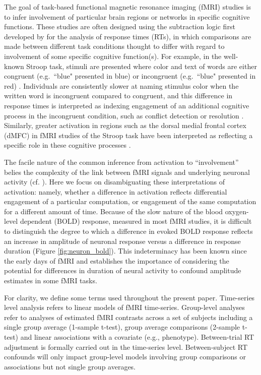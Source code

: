 \documentclass[sn-mathphys,Numbered, super, referee, lineno]{sn-jnl}
\begin{document}
The goal of task-based functional magnetic resonance imaging (fMRI) studies is to infer involvement of particular brain regions or networks in specific cognitive functions.  These studies are often designed using the subtraction logic first developed by \citet{donders1969} for the analysis of response times (RTs), in which comparisons are made between different task conditions thought to differ with regard to involvement of some specific cognitive function(s).  For example, in the well-known Stroop task, stimuli are presented where color and text of words are either congruent (e.g.\, ``blue" presented in blue) or incongruent (e.g.\, ``blue" presented in red) \citep{stroop_1935}.  Individuals are consistently slower at naming stimulus color when the written word is incongruent compared to congruent, and this difference in response times is interpreted as indexing engagement of an additional cognitive process in the incongruent condition, such as conflict detection or resolution \citep{botvinick2001}. Similarly, greater activation in regions such as the dorsal medial frontal cortex (dMFC) in fMRI studies of the Stroop task have been interpreted as reflecting a specific role in these cognitive processes \citep{botvinick1999, macdonald2000, kernsAnteriorCingulateConflict2004}.  

The facile nature of the common inference from activation to ``involvement'' belies the complexity of the link between fMRI signals and underlying neuronal activity (cf. \citet{logothetisWhatWeCan2008}).  Here we focus on disambiguating these interpretations of activation: namely, whether a difference in activation reflects differential engagement of a particular computation, or engagement of the same computation for a different amount of time.  Because of the slow nature of the blood oxygen-level dependent (BOLD) response, measured in most fMRI studies, it is difficult to distinguish the degree to which a difference in evoked BOLD response reflects an increase in amplitude of neuronal response versus a difference in response duration (Figure \ref{fig:neuron_bold}).  This indeterminacy has been known since the early days of fMRI \citep{savoy1995, fslbook2001} and establishes the importance of considering the potential for differences in duration of neural activity to confound amplitude estimates in some fMRI tasks.  

For clarity, we define some terms used throughout the present paper. Time-series level analysis refers to linear models of fMRI time-series. Group-level analyses refer to analyses of estimated fMRI contrasts across a set of subjects including a single group average (1-sample t-test), group average comparisons (2-sample t-test) and linear associations with a covariate (e.g., phenotype).  Between-trial RT adjustment is formally carried out in the time-series level. Between-subject RT confounds will only impact group-level models involving group comparisons or associations but not single group averages.  
\end{document}
